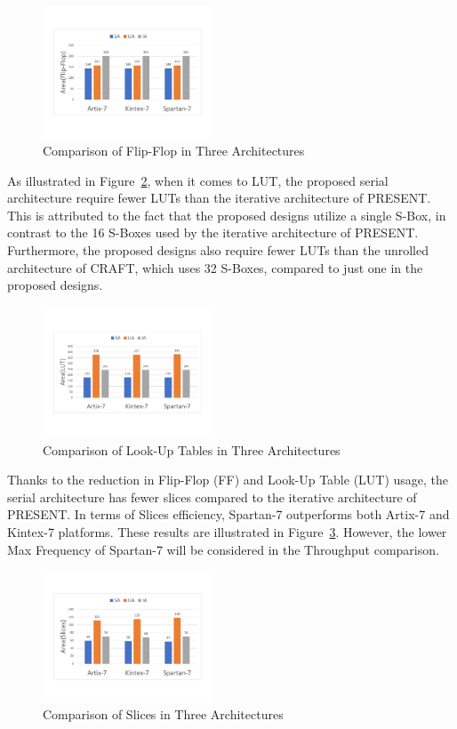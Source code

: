 \documentclass[final,5p,times,twocolumn]{elsarticle}
\begin{document}
\begin{figure}
    \centering
    \includegraphics[width=0.45\textwidth]{./fig/compare-ff.pdf}
    \caption{Comparison of Flip-Flop in Three Architectures}\label{compare_ff}
\end{figure}

As illustrated in Figure~\ref{compare_lut}, when it comes to LUT, the proposed serial architecture require fewer LUTs than the iterative architecture of PRESENT. This is attributed to the fact that the proposed designs utilize a single S-Box, in contrast to the 16 S-Boxes used by the iterative architecture of PRESENT. Furthermore, the proposed designs also require fewer LUTs than the unrolled architecture of CRAFT, which uses 32 S-Boxes, compared to just one in the proposed designs.

\begin{figure}
    \centering
    \includegraphics[width=0.45\textwidth]{./fig/compare-lut.pdf}
    \caption{Comparison of Look-Up Tables in Three Architectures}\label{compare_lut}
\end{figure}

Thanks to the reduction in Flip-Flop (FF) and Look-Up Table (LUT) usage, the serial architecture has fewer slices compared to the iterative architecture of PRESENT.
In terms of Slices efficiency, Spartan-7 outperforms both Artix-7 and Kintex-7 platforms.
These results are illustrated in Figure~\ref{compare-slices}. However, the lower Max Frequency of Spartan-7 will be considered in the Throughput comparison.

\begin{figure}
    \centering
    \includegraphics[width=0.45\textwidth]{./fig/compare-slices.pdf}
    \caption{Comparison of Slices in Three Architectures}\label{compare-slices}
\end{figure}
\end{document}
